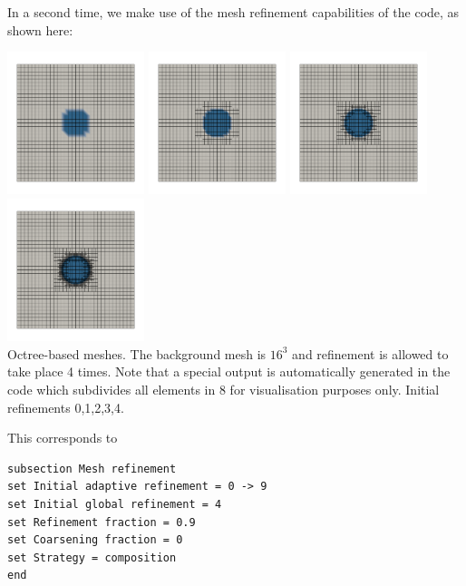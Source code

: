 In a second time, we make use of the mesh refinement capabilities of the code, as shown here:
\begin{center}
\includegraphics[width=4cm]{images/stokes_sphere2D/aspect_FS_amr/C1_0}
\includegraphics[width=4cm]{images/stokes_sphere2D/aspect_FS_amr/C1_1}
\includegraphics[width=4cm]{images/stokes_sphere2D/aspect_FS_amr/C1_2}
\includegraphics[width=4cm]{images/stokes_sphere2D/aspect_FS_amr/C1_3}\\
{\captionfont Octree-based \aspect meshes. The background mesh is $16^3$ and refinement is allowed to take place 4 times.
Note that a special output is automatically generated in the code which subdivides all elements in 8 for 
visualisation purposes only. Initial refinements 0,1,2,3,4.}
\end{center}
This corresponds to 
\begin{verbatim}
subsection Mesh refinement
set Initial adaptive refinement = 0 -> 9 
set Initial global refinement = 4 
set Refinement fraction = 0.9 
set Coarsening fraction = 0 
set Strategy = composition
end
\end{verbatim}

